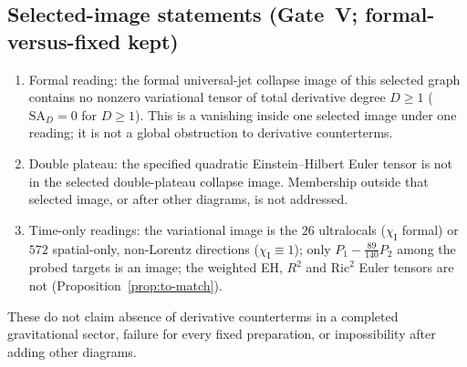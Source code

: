 \documentclass{article}
\theoremstyle{remark}
\newcommand{\chiI}{\chi_{\mathrm I}}
\begin{document}
\subsection{Selected-image statements (Gate~V; formal-versus-fixed kept)}
\begin{enumerate}
\item Formal reading: the formal universal-jet collapse image of this selected graph contains no nonzero variational tensor of total derivative degree $D\ge1$ ($\mathrm{SA}_D=0$ for $D\ge1$).
This is a vanishing inside one selected image under one reading; it is not a global obstruction to derivative counterterms.
\item Double plateau: the specified quadratic Einstein--Hilbert Euler tensor is not in the selected double-plateau collapse image.
Membership outside that selected image, or after other diagrams, is not addressed.
\item Time-only readings: the variational image is the $26$ ultralocals ($\chiI$ formal) or $572$ spatial-only, non-Lorentz directions ($\chiI\equiv1$); only $P_1-\tfrac{89}{140}P_2$ among the probed targets is an image; the weighted EH, $R^2$ and $\mathrm{Ric}^2$ Euler tensors are not (Proposition~\ref{prop:to-match}).
\end{enumerate}
These do not claim absence of derivative counterterms in a completed gravitational sector, failure for every fixed preparation, or impossibility after adding other diagrams.
\end{document}
